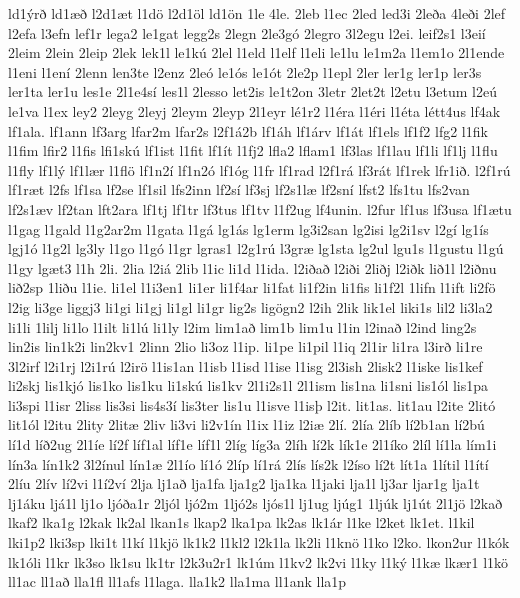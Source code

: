{ld1ýrð
ld1æð
l2d1æt
l1dö
l2d1öl
ld1ön
1le
4le.
2leb
l1ec
2led
led3i
2leða
4leði
2lef
l2efa
l3efn
lef1r
lega2
le1gat
legg2s
2legn
2le3gó
2legro
3l2egu
l2ei.
leif2s1
l3eií
2leim
2lein
2leip
2lek
lek1l
le1kú
2lel
l1eld
l1elf
l1eli
le1lu
le1m2a
l1em1o
2l1ende
l1eni
l1ení
2lenn
len3te
l2enz
2leó
le1ós
le1ót
2le2p
l1epl
2ler
ler1g
ler1p
ler3s
ler1ta
ler1u
les1e
2l1e4sí
les1l
2lesso
let2is
le1t2on
3letr
2let2t
l2etu
l3etum
l2eú
le1va
l1ex
ley2
2leyg
2leyj
2leym
2leyp
2l1eyr
lé1r2
l1éra
l1éri
l1éta
létt4us
lf4ak
lf1ala.
lf1ann
lf3arg
lfar2m
lfar2s
l2f1á2b
lf1áh
lf1árv
lf1át
lf1els
lf1f2
lfg2
l1fik
l1fim
lfir2
l1fis
lfi1skú
lf1ist
l1fit
lf1ít
l1fj2
lfla2
lflam1
lf3las
lf1lau
lf1li
lf1lj
l1flu
l1fly
lf1lý
lf1lær
l1flö
lf1n2í
lf1n2ó
lf1óg
l1fr
lf1rad
l2f1rá
lf3rát
lf1rek
lfr1ið.
l2f1rú
lf1ræt
l2fs
lf1sa
lf2se
lf1sil
lfs2inn
lf2sí
lf3sj
lf2s1læ
lf2sní
lfst2
lfs1tu
lfs2van
lf2s1æv
lf2tan
lft2ara
lf1tj
lf1tr
lf3tus
lf1tv
l1f2ug
lf4unin.
l2fur
lf1us
lf3usa
lf1ætu
l1gag
l1gald
l1g2ar2m
l1gata
l1gá
lg1ás
lg1erm
lg3i2san
lg2isi
lg2i1sv
l2gí
lg1ís
lgj1ó
l1g2l
lg3ly
l1go
l1gó
l1gr
lgras1
l2g1rú
l3græ
lg1sta
lg2ul
lgu1s
l1gustu
l1gú
l1gy
lgæt3
l1h
2li.
2lia
l2iá
2lib
l1ic
li1d
l1ida.
l2iðað
l2iði
2liðj
l2iðk
lið1l
l2iðnu
lið2sp
1liðu
l1ie.
li1el
l1i3en1
li1er
li1f4ar
li1fat
li1f2in
li1fis
li1f2l
1lifn
l1ift
li2fö
l2ig
li3ge
liggj3
li1gi
li1gj
li1gl
li1gr
lig2s
ligögn2
l2ih
2lik
lik1el
liki1s
lil2
li3la2
li1li
1lilj
li1lo
l1ilt
li1lú
li1ly
l2im
lim1að
lim1b
lim1u
l1in
l2inað
l2ind
ling2s
lin2is
lin1k2i
lin2kv1
2linn
2lio
li3oz
l1ip.
li1pe
li1pil
l1iq
2l1ir
li1ra
l3irð
li1re
3l2irf
l2i1rj
l2i1rú
l2irö
l1is1an
l1isb
l1isd
l1ise
l1isg
2l3ish
2lisk2
l1iske
lis1kef
li2skj
lis1kjó
lis1ko
lis1ku
li1skú
lis1kv
2l1i2s1l
2l1ism
lis1na
li1sni
lis1ól
lis1pa
li3spi
l1isr
2liss
lis3si
lis4s3í
lis3ter
lis1u
l1isve
l1isþ
l2it.
lit1as.
lit1au
l2ite
2litó
lit1ól
l2itu
2lity
2litæ
2liv
li3vi
li2v1ín
l1ix
l1iz
l2iæ
2lí.
2lía
2líb
lí2b1an
lí2bú
lí1d
líð2ug
2l1íe
lí2f
líf1al
líf1e
líf1l
2líg
líg3a
2líh
lí2k
lík1e
2l1íko
2líl
lí1la
lím1i
lín3a
lín1k2
3l2ínul
lín1æ
2l1ío
lí1ó
2líp
lí1rá
2lís
lís2k
l2íso
lí2t
lít1a
1lítil
l1ítí
2líu
2lív
lí2vi
l1í2ví
2lja
lj1að
lja1fa
lja1g2
lja1ka
l1jaki
lja1l
lj3ar
ljar1g
lja1t
lj1áku
ljá1l
lj1o
ljóða1r
2ljól
ljó2m
1ljó2s
ljós1l
lj1ug
ljúg1
1ljúk
lj1út
2l1jö
l2kað
lkaf2
lka1g
l2kak
lk2al
lkan1s
lkap2
lka1pa
lk2as
lk1ár
l1ke
l2ket
lk1et.
l1kil
lki1p2
lki3sp
lki1t
l1kí
l1kjö
lk1k2
l1kl2
l2k1la
lk2li
l1knö
l1ko
l2ko.
lkon2ur
l1kók
lk1óli
l1kr
lk3so
lk1su
lk1tr
l2k3u2r1
lk1úm
l1kv2
lk2vi
l1ky
l1ký
l1kæ
lkær1
l1kö
ll1ac
ll1að
lla1fl
ll1afs
l1laga.
lla1k2
lla1ma
ll1ank
lla1p
}
